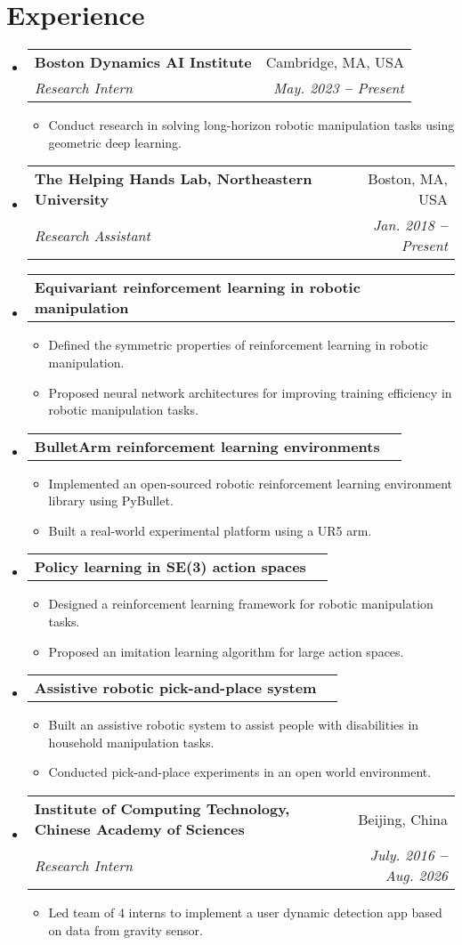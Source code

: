 \documentclass[letterpaper,11pt]{article}
\makeatletter
\newcommand{\resumeItem}[1]{
  \item\small{
    {#1 \vspace{-2pt}}
  }
}
\newcommand{\resumeSubheading}[4]{
  \vspace{-4pt}\item
    \begin{tabular*}{0.97\textwidth}[t]{l@{\extracolsep{\fill}}r}
      \textbf{\small#1} & \small#2 \\
      \textit{\small#3} & \textit{\small #4} \\
    \end{tabular*}\vspace{-7pt}
}
\newcommand{\resumeProjectHeading}[2]{
    \vspace{-7pt}\item
    \begin{tabular*}{0.97\textwidth}{l@{\extracolsep{\fill}}r}
      \hspace{13pt}\small#1 & #2 \\
    \end{tabular*}\vspace{-7pt}
}
\newcommand{\resumeSubHeadingListStart}{\begin{itemize}[leftmargin=0.15in, label={}]}
\newcommand{\resumeSubHeadingListEnd}{\end{itemize}}
\newcommand{\resumeItemListStart}{\begin{itemize}}
\newcommand{\resumeItemListEnd}{\end{itemize}\vspace{-5pt}}
\makeatother
\begin{document}
\section{Experience}
\resumeSubHeadingListStart
\vspace{2pt}
\resumeSubheading
{Boston Dynamics AI Institute}{Cambridge, MA, USA}
{Research Intern}{May. 2023 \textbf{--} Present}
\resumeItemListStart
\resumeItem{Conduct research in solving long-horizon robotic manipulation tasks using geometric deep learning.}
\resumeItemListEnd
\resumeSubheading
{The Helping Hands Lab, Northeastern University}{Boston, MA, USA}
{Research Assistant}{Jan. 2018 \textbf{--} Present}
\resumeProjectHeading{\textbf{Equivariant reinforcement learning in robotic manipulation}}{}
\resumeItemListStart
\resumeItem{Defined the symmetric properties of reinforcement learning in robotic manipulation. }
\resumeItem{Proposed neural network architectures for improving training efficiency in robotic manipulation tasks.}
\resumeItemListEnd

\resumeProjectHeading{\textbf{BulletArm reinforcement learning environments}}{}
\resumeItemListStart
\resumeItem{Implemented an open-sourced robotic reinforcement learning environment library using PyBullet.}
\resumeItem{Built a real-world experimental platform using a UR5 arm.}
\resumeItemListEnd

\resumeProjectHeading{\textbf{Policy learning in SE(3) action spaces}}{}
\resumeItemListStart
\resumeItem{Designed a reinforcement learning framework for robotic manipulation tasks.}
\resumeItem{Proposed an imitation learning algorithm for large action spaces.}
\resumeItemListEnd

\resumeProjectHeading{\textbf{Assistive robotic pick-and-place system}}{}
\resumeItemListStart
\resumeItem{Built an assistive robotic system to assist people with disabilities in household manipulation tasks.}
\resumeItem{Conducted pick-and-place experiments in an open world environment.}
\resumeItemListEnd

\resumeSubheading
{Institute of Computing Technology, Chinese Academy of Sciences}{Beijing, China}
{Research Intern}{July. 2016 \textbf{--} Aug. 2026}
\resumeItemListStart
\resumeItem{Led team of 4 interns to implement a user dynamic detection app based on data from gravity sensor.}
\resumeItemListEnd
\resumeSubHeadingListEnd
\end{document}
